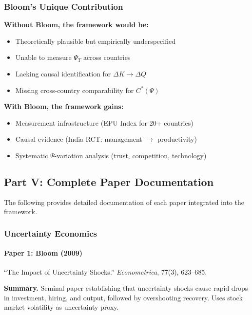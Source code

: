 \subsubsection{Bloom's Unique Contribution}

\textbf{Without Bloom, the framework would be:}
\begin{itemize}
    \item Theoretically plausible but empirically underspecified
    \item Unable to measure $\Psi_T$ across countries
    \item Lacking causal identification for $\Delta K \to \Delta Q$
    \item Missing cross-country comparability for $C^*(\Psi)$
\end{itemize}

\textbf{With Bloom, the framework gains:}
\begin{itemize}
    \item Measurement infrastructure (EPU Index for 20+ countries)
    \item Causal evidence (India RCT: management $\to$ productivity)
    \item Systematic $\Psi$-variation analysis (trust, competition, technology)
\end{itemize}

\subsection{Part V: Complete Paper Documentation}

The following provides detailed documentation of each paper integrated into the framework.

\subsubsection{Uncertainty Economics}

\paragraph{Paper 1: Bloom (2009)}

``The Impact of Uncertainty Shocks.''
\textit{Econometrica}, 77(3), 623--685.

\textbf{Summary.}
Seminal paper establishing that uncertainty shocks cause rapid drops in investment,
hiring, and output, followed by overshooting recovery. Uses stock market volatility
as uncertainty proxy.

